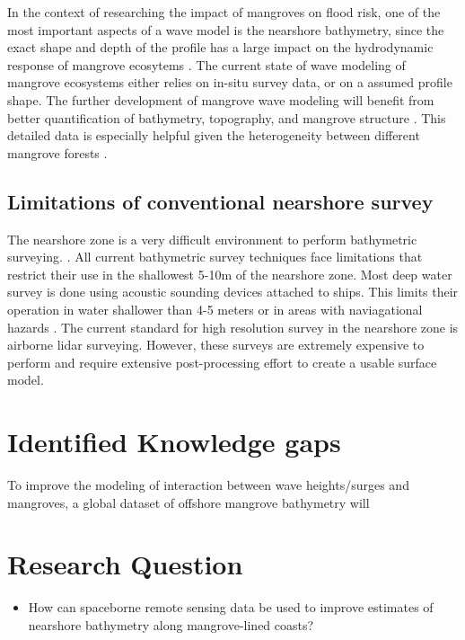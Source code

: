 In the context of researching the impact of mangroves on flood risk, one of the most important aspects of a wave model is the nearshore bathymetry, since the exact shape and depth of the profile has a large impact on the hydrodynamic response of mangrove ecosytems \cite{Horstman2014,Maza2019}. The current state of wave modeling of mangrove ecosystems either relies on in-situ survey data, or on a assumed profile shape. The further development of mangrove wave modeling will benefit from better quantification of bathymetry, topography, and mangrove structure \cite{Menendez2020}. This detailed data is especially helpful given the heterogeneity between different mangrove forests \cite{Mazda2013}.

\subsection{Limitations of conventional nearshore survey}

The nearshore zone is a very difficult environment to perform bathymetric surveying. \cite{Parrish2019}. All current bathymetric survey techniques face limitations that restrict their use in the shallowest 5-10m of the nearshore zone. Most deep water survey is done using acoustic sounding devices attached to ships. This limits their operation in water shallower than 4-5 meters or in areas with naviagational hazards \cite{Cesbron2021,add}. The current standard for high resolution survey in the nearshore zone is airborne lidar surveying. However, these surveys are extremely expensive to perform and require extensive post-processing effort to create a usable surface model.

\section{Identified Knowledge gaps}

To improve the modeling of interaction between wave heights/surges and mangroves, a global dataset of offshore mangrove bathymetry will 
\section{Research Question}

\begin{itemize}
      \item How can spaceborne remote sensing data be used to improve estimates of nearshore bathymetry along mangrove-lined coasts?
\end{itemize}

